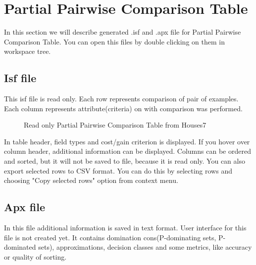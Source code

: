 \section{Partial Pairwise Comparison Table}\label{section:pct}

In this section we will describe generated .isf and .apx file for Partial Pairwise Comparison Table. You can open this files by double clicking on them in workspace tree.

\subsection{Isf file}\label{sub:pct-isf}

This isf file is read only. Each row represents comparison of pair of examples. Each column represents attribute(criteria) on with comparison was performed.

\begin{figure*}[!ht] 
	\centering
	\caption{Read only Partial Pairwise Comparison Table from Houses7}
\end{figure*}

In table header, field types and cost/gain criterion is displayed. If you hover over column header, additional information can be displayed. Columns can be ordered and sorted, but it will not be saved to file, because it is read only. You can also export selected rows to CSV format. You can do this by selecting rows and choosing "Copy selected rows" option from context menu.

\subsection{Apx file}\label{sub:pct-apx}

In this file additional information is saved in text format. User interface for this file is not created yet. It contains domination cons(P-dominating sets, P-dominated sets), approximations, decision classes and some metrics, like accuracy or quality of sorting.

\vfill\newpage